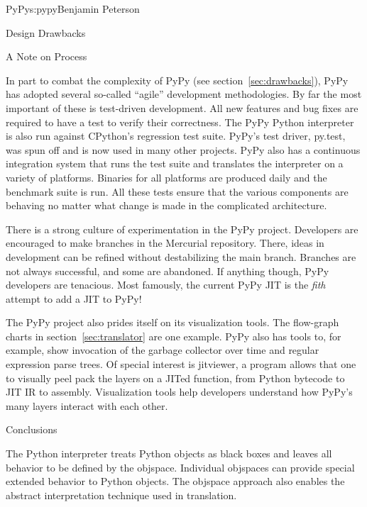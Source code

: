 \begin{aosachapter}{PyPy}{s:pypy}{Benjamin Peterson}
\begin{aosasect1}{Design Drawbacks}
\end{aosasect1}

\begin{aosasect1}{A Note on Process}

In part to combat the complexity of PyPy (see section~\ref{sec:drawbacks}), PyPy
has adopted several so-called ``agile'' development methodologies. By far the
most important of these is test-driven development. All new features and bug
fixes are required to have a test to verify their correctness. The PyPy Python
interpreter is also run against CPython's regression test suite. PyPy's test
driver, py.test, was spun off and is now used in many other projects. PyPy also
has a continuous integration system that runs the test suite and translates the
interpreter on a variety of platforms. Binaries for all platforms are produced
daily and the benchmark suite is run. All these tests ensure that the various
components are behaving no matter what change is made in the complicated
architecture.

There is a strong culture of experimentation in the PyPy project. Developers are
encouraged to make branches in the Mercurial repository. There, ideas in
development can be refined without destabilizing the main branch. Branches are
not always successful, and some are abandoned. If anything though, PyPy
developers are tenacious. Most famously, the current PyPy JIT is the \emph{fith}
attempt to add a JIT to PyPy!

The PyPy project also prides itself on its visualization tools. The flow-graph
charts in section~\ref{sec:translator} are one example. PyPy also has tools to,
for example, show invocation of the garbage collector over time and regular
expression parse trees. Of special interest is jitviewer, a program allows that
one to visually peel pack the layers on a JITed function, from Python bytecode
to JIT IR to assembly. Visualization tools help developers understand how PyPy's
many layers interact with each other.

\end{aosasect1}

\begin{aosasect1}{Conclusions}

The Python interpreter treats Python objects as black boxes and leaves all
behavior to be defined by the objspace. Individual objspaces can provide special
extended behavior to Python objects. The objspace approach also enables the
abstract interpretation technique used in translation.


\end{aosasect1}
\end{aosachapter}
